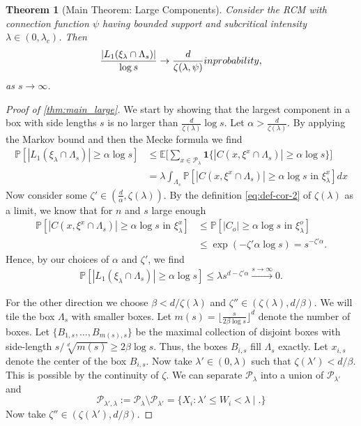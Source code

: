 \documentclass[10pt,a4paper]{amsart}
\newtheorem{theorem}{Theorem}
\newcommand{\E}{\mathbb{E}}
\renewcommand{\P}{\mathbb{P}}
\newcommand{\conn}{\psi}
\newcommand{\set}[2]{\big\{ #1 \mid #2 \big\}}
\begin{document}
\begin{theorem}[Main Theorem: Large Components]\label{thm:main_large}
  Consider the RCM with connection function $\conn$  having bounded support and subcritical intensity $\lambda\in(0, \lambda_c)$. Then
  $$
  \frac{|L_1(\xi_{\lambda}\cap \Lambda_s)|}{\log s}
  \to
  \frac{d}{\zeta(\lambda, \psi)}
  \textup{ in probability},
  $$
  as $s\rightarrow\infty$.
\end{theorem}

  \begin{proof}[Proof of \autoref{thm:main_large}]
    We start by showing that the largest component in a box with side lengths $s$ is no larger than $\frac{d}{\zeta(\lambda)}\log s$. Let $\alpha > \frac{d}{\zeta(\lambda)}$. By applying the Markov bound and then the Mecke formula we find
    \begin{align*}
      \P[
        |L_1(\mathcal \xi_{\lambda}\cap \Lambda_s)|
        \geq
        \alpha \log s
      ]
      & \leq
      \E \Big[
        \sum_{x\in\mathcal P_\lambda}
        \mathbf{1}\{|C(x, \xi^x\cap\Lambda_s)|\geq \alpha\log s\}
      \Big]
      \\
      & =
      \lambda\int_{\Lambda_s}
      \P[
        |C(x, \xi^x\cap\Lambda_s)|\geq\alpha \log s \text{ in }\xi^x_{\lambda}
      ]
      dx
    \end{align*}
    Now consider some $\zeta'\in(\frac d\alpha,\zeta(\lambda))$. By the
    definition \eqref{eq:def-cor-2} of $\zeta(\lambda)$ as a limit, we know that for $n$ and $s$ large enough
    \begin{align*}
      \P[|C(x, \xi^x\cap\Lambda_s)|\geq\alpha \log s\text{ in }\xi^x_{\lambda}]
      & \leq
      \P[|C_o|\geq \alpha \log s\text{ in }\xi^o_{\lambda}]
      \\
      & \leq
      \exp(-\zeta'\alpha \log s) = s^{-\zeta'\alpha}.
    \end{align*}
    Hence, by our choices of $\alpha$ and $\zeta'$, we find
    \begin{align*}
      \P[|L_1(\mathcal \xi_{\lambda}\cap \Lambda_s)|
        \geq
        \alpha \log s
      ]
      \leq
      \lambda s^{d-\zeta'\alpha}\xrightarrow{s\to\infty}0.
    \end{align*}

    For the other direction we choose $\beta < {d}/{\zeta(\lambda)}$ and $\zeta''\in(\zeta(\lambda), d / \beta)$.
    We will tile the box $\Lambda_s$ with smaller boxes.
    Let $m(s) = \lfloor\frac{s}{2\beta\log s}\rfloor^d$ denote the number of boxes.
    Let $\{B_{1,s},\dots, B_{m(s), s}\}$ be the maximal collection of disjoint boxes with side-length $s/\sqrt[d]{m(s)}\geq 2\beta \log s$.
    Thus, the boxes $B_{i,s}$ fill $\Lambda_s$ exactly.
    Let $x_{i,s}$ denote the center of the box $B_{i,s}$.
    Now take $\lambda'\in(0,\lambda)$ such that $\zeta(\lambda')<d/\beta$.
    This is possible by the continuity of $\zeta$.
    We can separate $\mathcal P_\lambda$ into a union of $\mathcal P_{\lambda'}$ and
    $$
    \mathcal P_{\lambda', \lambda} := \mathcal P_\lambda \setminus \mathcal
    P_{\lambda'}
    =
    \set
    {X_i:
    \lambda'\leq W_i<\lambda}.
    $$
    Now take $\zeta'' \in (\zeta(\lambda'),d/\beta)$.


\end{proof}
\end{document}
